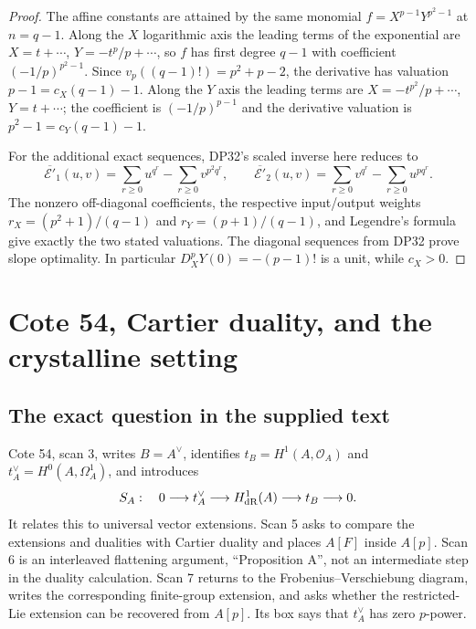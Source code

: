 \documentclass[11pt,a4paper]{article}
\theoremstyle{definition}\newtheorem{remark}[theorem]{Remark}
\begin{document}
\begin{proof}
The affine constants are attained by the same monomial $f=X^{p-1}Y^{p^2-1}$ at $n=q-1$. Along the $X$ logarithmic axis the leading terms of the exponential are $X=t+\cdots$, $Y=-t^p/p+\cdots$, so $f$ has first degree $q-1$ with coefficient $(-1/p)^{p^2-1}$. Since $v_p((q-1)!)=p^2+p-2$, the derivative has valuation $p-1=c_X(q-1)-1$. Along the $Y$ axis the leading terms are $X=-t^{p^2}/p+\cdots$, $Y=t+\cdots$; the coefficient is $(-1/p)^{p-1}$ and the derivative valuation is $p^2-1=c_Y(q-1)-1$.

For the additional exact sequences, DP32's scaled inverse here reduces to
\[
 \overline{\mathcal E'}_1(u,v)=\sum_{r\ge0}u^{q^r}-\sum_{r\ge0}v^{p^2q^r},\qquad
 \overline{\mathcal E'}_2(u,v)=\sum_{r\ge0}v^{q^r}-\sum_{r\ge0}u^{pq^r}.
\]
The nonzero off-diagonal coefficients, the respective input/output weights $r_X=(p^2+1)/(q-1)$ and $r_Y=(p+1)/(q-1)$, and Legendre's formula give exactly the two stated valuations. The diagonal sequences from DP32 prove slope optimality. In particular $D_X^pY(0)=-(p-1)!$ is a unit, while $c_X>0$.
\end{proof}

\section{Cote 54, Cartier duality, and the crystalline setting}

\subsection{The exact question in the supplied text}

Cote 54, scan 3, writes $B=A^\vee$, identifies $t_B=H^1(A,\mathcal O_A)$ and $t_A^\vee=H^0(A,\Omega_A^1)$, and introduces
\begin{equation}\label{eq:SA}
 S_A:\quad 0\longrightarrow t_A^\vee\longrightarrow H^1_{\mathrm{dR}}(A)
 \longrightarrow t_B\longrightarrow0.
\end{equation}
It relates this to universal vector extensions. Scan 5 asks to compare the extensions and dualities with Cartier duality and places $A[F]$ inside $A[p]$. Scan 6 is an interleaved flattening argument, ``Proposition A'', not an intermediate step in the duality calculation. Scan 7 returns to the Frobenius--Verschiebung diagram, writes the corresponding finite-group extension, and asks whether the restricted-Lie extension can be recovered from $A[p]$. Its box says that $t_A^\vee$ has zero $p$-power.
\end{document}

